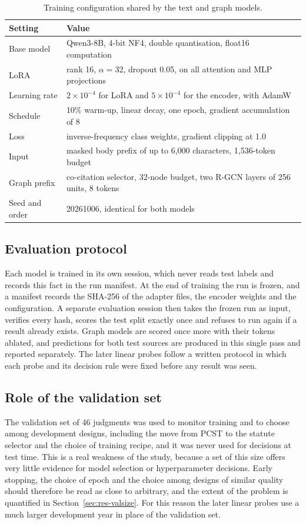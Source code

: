 \documentclass[11pt,a4paper]{article}
\begin{document}
\begin{table}[t]\centering\small
\caption{Training configuration shared by the text and graph models.}\label{tab:config}
\begin{tabular}{@{}lY{9.3cm}@{}}\toprule Setting & Value\\\midrule
Base model & Qwen3-8B, 4-bit NF4, double quantisation, float16 computation\\
LoRA & rank 16, $\alpha=32$, dropout 0.05, on all attention and MLP projections\\
Learning rate & $2\times10^{-4}$ for LoRA and $5\times10^{-4}$ for the encoder, with AdamW\\
Schedule & 10\% warm-up, linear decay, one epoch, gradient accumulation of 8\\
Loss & inverse-frequency class weights, gradient clipping at 1.0\\
Input & masked body prefix of up to 6,000 characters, 1,536-token budget\\
Graph prefix & co-citation selector, 32-node budget, two R-GCN layers of 256 units, 8 tokens\\
Seed and order & 20261006, identical for both models\\\bottomrule
\end{tabular}\end{table}

\subsection{Evaluation protocol}
Each model is trained in its own session, which never reads test labels and records this fact in the run manifest. At the end of training the run is frozen, and a manifest records the SHA-256 of the adapter files, the encoder weights and the configuration. A separate evaluation session then takes the frozen run as input, verifies every hash, scores the test split exactly once and refuses to run again if a result already exists. Graph models are scored once more with their tokens ablated, and predictions for both test sources are produced in this single pass and reported separately. The later linear probes follow a written protocol in which each probe and its decision rule were fixed before any result was seen.

\subsection{Role of the validation set}
The validation set of 46 judgments was used to monitor training and to choose among development designs, including the move from PCST to the statute selector and the choice of training recipe, and it was never used for decisions at test time. This is a real weakness of the study, because a set of this size offers very little evidence for model selection or hyperparameter decisions. Early stopping, the choice of epoch and the choice among designs of similar quality should therefore be read as close to arbitrary, and the extent of the problem is quantified in Section~\ref{sec:res-valsize}. For this reason the later linear probes use a much larger development year in place of the validation set.
\end{document}
